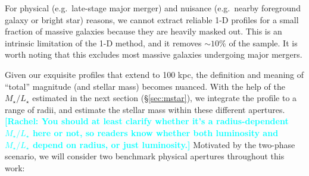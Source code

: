 \documentclass[a4paper,fleqn,usenatbib]{mnras}
\def\rbcg{\texttt{cenHighMh}}
\def\nbcg{\texttt{cenLowMh}}
\def\m2l{{$M_{\star}/L_{\star}$}}
\newcommand{\rachel}[1]{\textcolor{cyan}{\textbf{[Rachel: #1]}}}
\begin{document}
    
    For physical (e.g.\ late-stage major merger) and nuisance (e.g.\ nearby foreground 
    galaxy or bright star) reasons, we cannot extract reliable 1-D profiles for a small 
    fraction of massive galaxies because they are heavily masked out. 
    This is an intrinsic limitation of the 1-D method, and it removes ${\sim}10$\% of 
    the sample.
    It is worth noting that this excludes most massive galaxies undergoing major mergers. 
    
    Given our exquisite profiles that extend to 100 kpc, the definition and meaning 
    of ``total'' magnitude (and stellar mass) becomes nuanced.
    With the help of the \m2l{} estimated in the next section (\S \ref{sec:mstar}), 
    we integrate the profile to a range of radii, and estimate the stellar mass 
    within these different apertures.  \rachel{You should at least clarify whether it's a radius-dependent \m2l{} here or not, so readers know whether both luminosity and \m2l{} depend on radius, or just luminosity.}
    Motivated by the two-phase scenario, we will consider two benchmark physical 
    apertures throughout this work:
    
\end{document}
